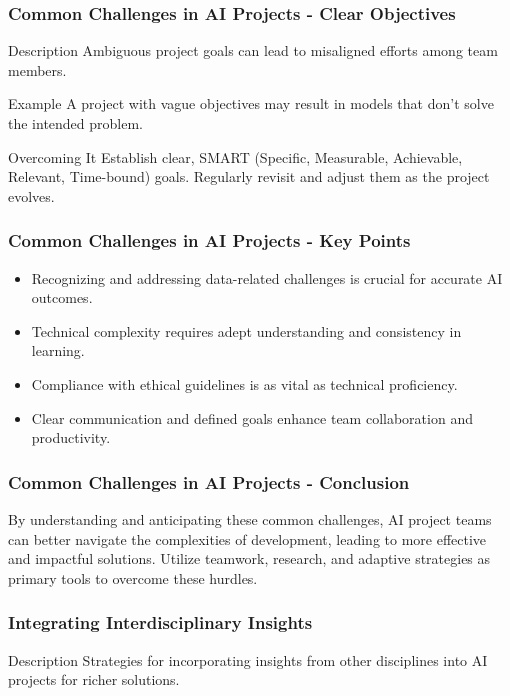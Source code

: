\documentclass[aspectratio=169]{beamer}
\begin{document}
\begin{frame}[fragile]
    \frametitle{Common Challenges in AI Projects - Clear Objectives}
    \begin{block}{Description}
        Ambiguous project goals can lead to misaligned efforts among team members.
    \end{block}
    \begin{block}{Example}
        A project with vague objectives may result in models that don’t solve the intended problem.
    \end{block}
    \begin{block}{Overcoming It}
        Establish clear, SMART (Specific, Measurable, Achievable, Relevant, Time-bound) goals. Regularly revisit and adjust them as the project evolves.
    \end{block}
\end{frame}

\begin{frame}[fragile]
    \frametitle{Common Challenges in AI Projects - Key Points}
    \begin{itemize}
        \item Recognizing and addressing data-related challenges is crucial for accurate AI outcomes.
        \item Technical complexity requires adept understanding and consistency in learning.
        \item Compliance with ethical guidelines is as vital as technical proficiency.
        \item Clear communication and defined goals enhance team collaboration and productivity.
    \end{itemize}
\end{frame}

\begin{frame}[fragile]
    \frametitle{Common Challenges in AI Projects - Conclusion}
    By understanding and anticipating these common challenges, AI project teams can better navigate the complexities of development, leading to more effective and impactful solutions. Utilize teamwork, research, and adaptive strategies as primary tools to overcome these hurdles.
\end{frame}

\begin{frame}[fragile]
    \frametitle{Integrating Interdisciplinary Insights}
    \begin{block}{Description}
        Strategies for incorporating insights from other disciplines into AI projects for richer solutions.
    \end{block}
\end{frame}
\end{document}
